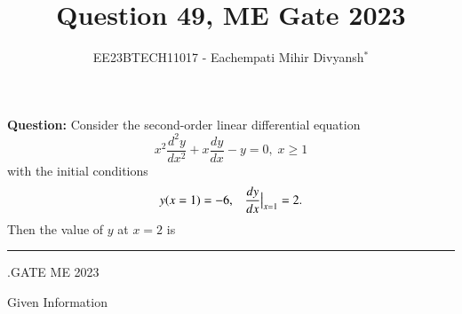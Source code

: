 \documentclass[journal,12pt,twocolumn]{IEEEtran}
\theoremstyle{remark}
\begin{document}

\vspace{3cm}

\title{Question 49, ME Gate 2023}
\author{EE23BTECH11017 - Eachempati Mihir Divyansh$^{*}$}
\maketitle
\newpage
\bigskip

\renewcommand{\thefigure}{\theenumi}
\renewcommand{\thetable}{\theenumi}
\textbf{Question:} Consider the second-order linear differential equation
\[x^2\frac{d^2y}{dx^2}+x\frac{dy}{dx}-y=0, \; x\geq 1\]
with the initial conditions $$y(x=1)=-6,\; \;\; \frac{dy}{dx}\big{|}_{x=1}=2.$$
Then the value of $y$ at $x=2$ is \rule{2cm}{0.1mm}.{\hfill{GATE ME 2023}}\\

\solution
\begin{table}[h!]
    \centering
    
    \caption{Given Information} \label{gateME49.tab:1}
\end{table}
\end{document}
